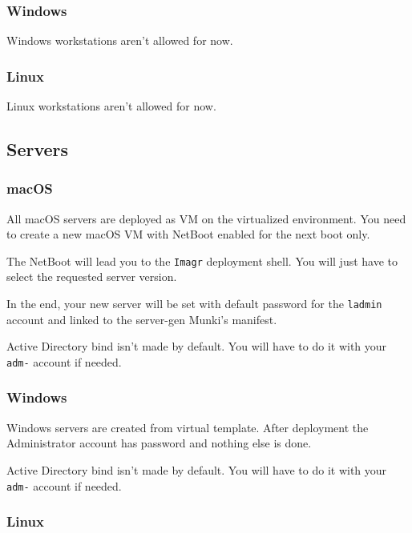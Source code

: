 \documentclass{demo}
\begin{document}
\subsubsection{Windows}

Windows workstations aren't allowed for now.

\subsubsection{Linux}

Linux workstations aren't allowed for now.

\subsection{Servers}

\subsubsection{macOS}

All macOS servers are  deployed as VM on the virtualized environment. You need to create a new macOS VM with NetBoot enabled for the next boot only.

The NetBoot will lead you to the \texttt{Imagr} deployment shell. You will just have to select the requested server version.

In the end, your new server will be set with default password  for the \texttt{ladmin} account and linked to the server-gen Munki's manifest.

Active Directory bind isn't made by default. You will have to do it with your \texttt{adm-} account if needed.

\subsubsection{Windows}

Windows servers are created from virtual template. After deployment the Administrator account has password  and nothing else is done.

Active Directory bind isn't made by default. You will have to do it with your \texttt{adm-} account if needed.

\subsubsection{Linux}
\end{document}
